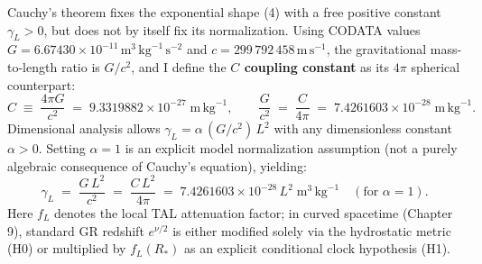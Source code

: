 \documentclass[10pt,a4paper]{article}
\begin{document}
\par
Cauchy's theorem fixes the exponential shape (4) with a free positive constant $\gamma_L > 0$, but does not by itself fix its normalization. Using CODATA values $G = 6.67430\times 10^{-11}\,\text{m}^3\,\text{kg}^{-1}\,\text{s}^{-2}$ and $c = 299\,792\,458\,\text{m}\,\text{s}^{-1}$, the gravitational mass-to-length ratio is $G/c^2$, and I define the \textbf{$C$ coupling constant} as its $4\pi$ spherical counterpart:
\begin{equation}
  C \;\equiv\; \frac{4\pi G}{c^2} \;=\; 9.3319882\times 10^{-27}\;\text{m}\,\text{kg}^{-1}, \qquad
  \frac{G}{c^2} \;=\; \frac{C}{4\pi} \;=\; 7.4261603\times 10^{-28}\;\text{m}\,\text{kg}^{-1}.
\end{equation}
Dimensional analysis allows $\gamma_L = \alpha\,(G/c^2)\,L^2$ with any dimensionless constant $\alpha > 0$. Setting $\alpha = 1$ is an explicit model normalization assumption (not a purely algebraic consequence of Cauchy's equation), yielding:
\begin{equation}
  \gamma_L \;=\; \frac{G\,L^2}{c^2} \;=\; \frac{C\,L^2}{4\pi} \;=\; 7.4261603\times 10^{-28}\,L^2\;\text{m}^3\,\text{kg}^{-1}\quad(\text{for }\alpha=1).
\end{equation}
Here $f_L$ denotes the local TAL attenuation factor; in curved spacetime (Chapter 9), standard GR redshift $e^{\nu/2}$ is either modified solely via the hydrostatic metric (H0) or multiplied by $f_L(R_*)$ as an explicit conditional clock hypothesis (H1).
\end{document}
